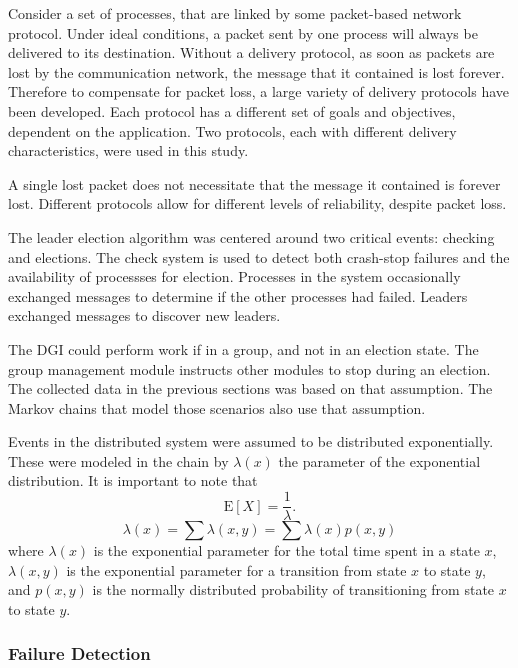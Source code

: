 Consider a set of processes, that are linked by some packet-based network protocol.
Under ideal conditions, a packet sent by one process  will always be delivered to its destination.
Without a delivery protocol, as soon as packets are lost by the communication network, the message that it contained is lost forever.
Therefore to compensate for packet loss, a large variety of delivery protocols have been developed.
Each protocol has a different set of goals and objectives, dependent on the application.
Two protocols, each with different delivery characteristics, were used in this study.

A single lost packet does not necessitate that the message it contained is forever lost.
Different protocols allow for different levels of reliability, despite packet loss.

The leader election algorithm was centered around two critical events: checking and elections.
The check system is used to detect both crash-stop failures and the availability of processses for election.
Processes in the system occasionally exchanged messages to determine if the other processes had failed.
Leaders exchanged messages to discover new leaders. 

The DGI could perform work if in a group, and not in an election state. 
The group management module instructs other modules to stop during an election.
The collected data in the previous sections was based on that assumption.
The Markov chains that model those scenarios also use that assumption.

Events in the distributed system were assumed to be distributed exponentially.
These were modeled in the chain by $\lambda(x)$ the parameter of the exponential distribution. \cite{MARKOV1}\cite{MARKOV2}
It is important to note that
\begin{equation}
\mathrm{E}[X] = \frac{1}{\lambda}. \!
\end{equation}
\begin{equation}
\lambda(x) = \sum \lambda(x,y) = \sum \lambda(x) p(x,y)
\end{equation}
where $\lambda(x)$ is the exponential parameter for the total time spent in a state $x$, $\lambda(x,y)$ is the exponential parameter for a transition from state $x$ to state $y$, and $p(x,y)$ is the normally distributed probability of transitioning from state $x$ to state $y$.

\subsubsection{Failure Detection}

